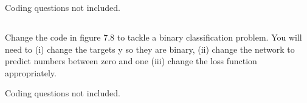 \documentclass[12pt]{report}
\begin{document}
Coding questions not included.

\subsection{}
\begin{mdframed}
    Change the code in figure 7.8 to tackle a binary classification problem. You will
    need to (i) change the targets y so they are binary, (ii) change the network to predict numbers between zero and one (iii) change the loss function appropriately.
\end{mdframed}

Coding questions not included.
\end{document}
